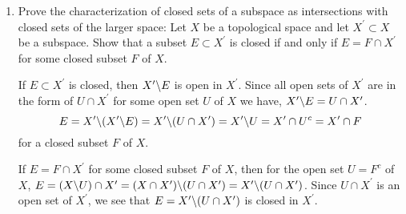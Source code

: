 \documentclass[12pt]{article}
\newcommand{\xprime}{X^\prime}
\begin{document}
\begin{enumerate}
\item Prove the characterization of closed sets of a subspace
as intersections with closed sets of the larger space:
Let $X$ be a topological space and let $X^\prime\subset
X$ be a subspace. Show that a subset $E\subset X^\prime$
is closed if and only if $E = F\cap X^\prime$ for some
closed subset $F$ of $X$.
\begin{mybox}
  
If $E\subset\xprime$ is closed, then $\xprime\char`\\E$ is open
in $\xprime$. Since all open sets of $\xprime$ are in
the form of $U\cap\xprime$ for some open set $U$ of $X$
we have, $\xprime\char`\\E=U\cap\xprime$.
$$E=\xprime\char`\\(\xprime\char`\\E)=\xprime
\char`\\(U\cap\xprime)=\xprime\char`\\U=\xprime\cap U^c
=\xprime\cap F$$
for a closed subset $F$ of $X$.

\setlength{\parskip}{3mm}
If $E = F\cap X^\prime$ for some closed subset $F$
of $X$, then for the open set $U=F^c$ of $X$,
$E=(X\char`\\U)\cap \xprime=(X\cap\xprime)
\char`\\(U\cap\xprime)=\xprime\char`\\(U\cap\xprime)$.
Since $U\cap \xprime$ is an open set of $\xprime$, we see
that $E=\xprime\char`\\(U\cap\xprime)$
is closed in $\xprime$.
\end{mybox}

\end{enumerate}
\end{document}
